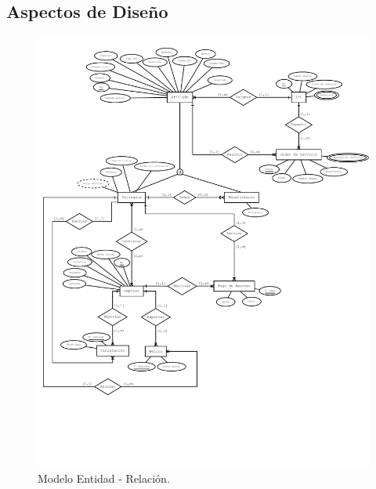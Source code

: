 \documentclass[12pt,a4paper]{article}
\begin{document}
\subsection{Aspectos de Diseño}
\begin{figure}[H]
\centering
{\includegraphics[width=1\textwidth]{Entity_relationship_diagram.pdf} \par}
\caption{Modelo Entidad - Relación.}
\end{figure}
\end{document}
